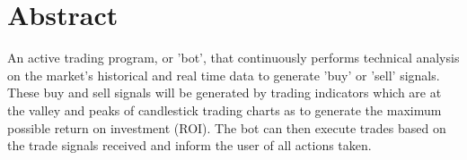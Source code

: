 %

%
\chapter*{Abstract}
\label{sec:abstract}
\thispagestyle{empty}

An active trading program, or 'bot', that continuously performs technical analysis on the market's historical and real time data to generate 'buy' or 'sell' signals. These buy and sell signals will be generated by trading indicators which are at the valley and peaks of candlestick trading charts as to generate the maximum possible return on investment (ROI). The bot can then execute trades based on the trade signals received and inform the user of all actions taken.

\newpage





